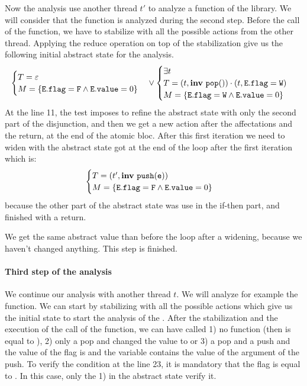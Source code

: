 Now the analysis use another thread $t'$ to analyze a function of the library. We will consider that the function  is analyzed during the second step. Before the call of the  function, we have to stabilize with all the possible actions from the other thread. Applying the reduce operation on top of the stabilization give us the following initial abstract state for the  analysis.
\[\begin{cases}
	T = \varepsilon\\
	M = \{\mathtt{E.flag} = \mathtt{F} \wedge \mathtt{E.value} = 0\}
\end{cases} \vee
\begin{cases}
	\exists t \\
	T = (t, \mathbf{inv}\ \mathtt{pop}()) \cdot (t, \mathtt{E.flag} = \mathtt{W})\\
	M = \{\mathtt{E.flag} = \mathtt{W} \wedge \mathtt{E.value} = 0\}
\end{cases}
\]
At the line 11, the test imposes to refine the abstract state with only the second part of the disjunction, and then we get a new action after the affectations and the return, at the end of the atomic bloc. 
After this first iteration we need to widen with the abstract state got at the end of the loop after the first iteration which is: 
\[\begin{cases}
	T = (t', \mathbf{inv}\ \mathtt{push}(\mathtt{e}))\\
	M = \{\mathtt{E.flag} = \mathtt{F} \wedge \mathtt{E.value} = 0\}
\end{cases}
\]
because the other part of the abstract state was use in the if-then part, and finished with a return.

We get the same abstract value than before the loop after a widening, because we haven't changed anything. This step is finished.








\paragraph{Third step of the analysis} We continue our analysis with another thread $t$. We will analyze for example the  function. We can start by stabilizing with all the possible actions which give us the initial state to start the analysis of the .
After the stabilization and the execution of the call of the function, we can have called 1) no function (then  is equal to ), 2) only a pop and changed the  value to  or 3) a pop and a push and the value of the flag is  and the variable  contains the value of the argument of the push.
To verify the condition at the line 23, it is mandatory that the flag is equal to . In this case, only the 1) in the abstract state verify it. 


